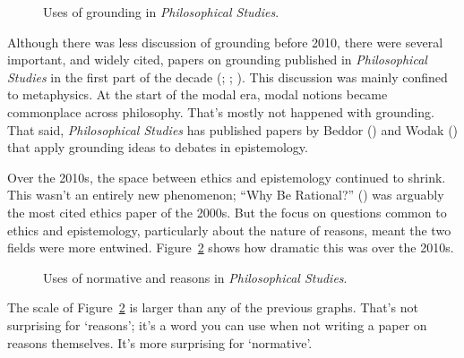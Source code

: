 \documentclass[
  10pt,
  letterpaper,
  DIV=11,
  numbers=noendperiod,
  twoside]{scrartcl}
\begin{document}
\begin{figure}


\caption{\label{fig-grounding}Uses of grounding in \emph{Philosophical
Studies}.}

\end{figure}%

Although there was less discussion of grounding before 2010, there were
several important, and widely cited, papers on grounding published in
\emph{Philosophical Studies} in the first part of the decade
(;
;
). This discussion was
mainly confined to metaphysics. At the start of the modal era, modal
notions became commonplace across philosophy. That's mostly not happened
with grounding. That said, \emph{Philosophical Studies} has published
papers by Beddor () and Wodak
() that apply grounding ideas to
debates in epistemology.

Over the 2010s, the space between ethics and epistemology continued to
shrink. This wasn't an entirely new phenomenon; ``Why Be Rational?''
() was arguably the most
cited ethics paper of the 2000s. But the focus on questions common to
ethics and epistemology, particularly about the nature of reasons, meant
the two fields were more entwined. Figure~\ref{fig-normative-reasons}
shows how dramatic this was over the 2010s.

\begin{figure}


\caption{\label{fig-normative-reasons}Uses of normative and reasons in
\emph{Philosophical Studies}.}

\end{figure}%

The scale of Figure~\ref{fig-normative-reasons} is larger than any of
the previous graphs. That's not surprising for `reasons'; it's a word
you can use when not writing a paper on reasons themselves. It's more
surprising for `normative'.
\end{document}
